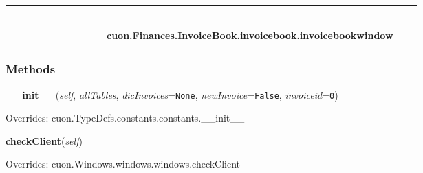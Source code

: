 \begin{tabular}{cccccccccccccc}
&&\multicolumn{1}{|c}{}
&&
  \\\cline{9-9}
  &&&&&&&&\multicolumn{1}{c|}{}
&\multicolumn{1}{|c}{}&
&&
  \\
\multicolumn{8}{r}{\settowidth{\BCL}{cuon.TypeDefs.constants.constants}\multirow{2}{\BCL}{cuon.TypeDefs.constants.constants}}
&&\multicolumn{1}{|c}{}
&&
  \\\cline{9-9}
  &&&&&&&&\multicolumn{1}{c|}{}
&\multicolumn{1}{|c}{}&
&&
  \\
\multicolumn{10}{r}{\settowidth{\BCL}{cuon.Windows.windows.windows}\multirow{2}{\BCL}{cuon.Windows.windows.windows}}
&&
  \\\cline{11-11}
  &&&&&&&&&&\multicolumn{1}{c|}{}
&&
  \\
&&&&&&&&&&\multicolumn{2}{l}{\textbf{cuon.Finances.InvoiceBook.invoicebook.invoicebookwindow}}
\end{tabular}



  \subsubsection{Methods}

    \vspace{0.5ex}

\hspace{.8\funcindent}\begin{boxedminipage}{\funcwidth}

    \raggedright \textbf{\_\_init\_\_}(\textit{self}, \textit{allTables}, \textit{dicInvoices}={\tt None}, \textit{newInvoice}={\tt False}, \textit{invoiceid}={\tt 0})

\setlength{\parskip}{2ex}
\setlength{\parskip}{1ex}
      Overrides: cuon.TypeDefs.constants.constants.\_\_init\_\_

    \end{boxedminipage}

    \vspace{0.5ex}

\hspace{.8\funcindent}\begin{boxedminipage}{\funcwidth}

    \raggedright \textbf{checkClient}(\textit{self})

\setlength{\parskip}{2ex}
\setlength{\parskip}{1ex}
      Overrides: cuon.Windows.windows.windows.checkClient

    \end{boxedminipage}

